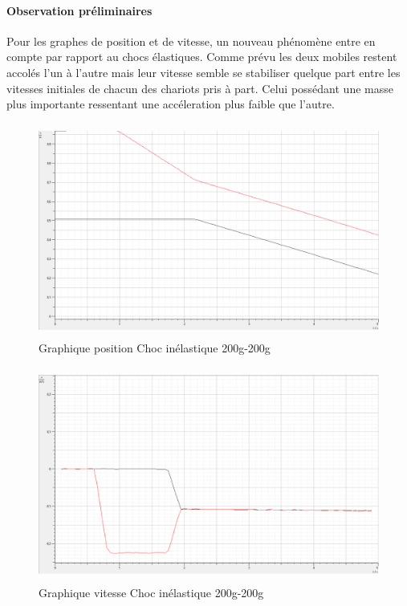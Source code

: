 \paragraph{Observation préliminaires}

Pour les graphes de position et de vitesse, un nouveau phénomène entre en compte par rapport au chocs élastiques. Comme prévu les deux mobiles restent accolés l'un à l'autre mais leur vitesse semble se stabiliser quelque part entre les vitesses initiales de chacun des chariots pris à part. Celui possédant une masse plus importante ressentant une accéleration plus faible que l'autre.

\newpage

\begin{figure}[h]
    \caption[Graphique position Choc inélastique 200g-200g]{Graphique position Choc inélastique 200g-200g}
    \centering
    \includegraphics[height=19em]{Data/200-200inela01.png}
\end{figure}

\begin{figure}[h]
    \caption[Graphique vitesse Choc inélastique 200g-200g]{Graphique vitesse Choc inélastique 200g-200g}
    \centering
    \includegraphics[height=19em]{Data/200-200inela02v.png}
\end{figure}

